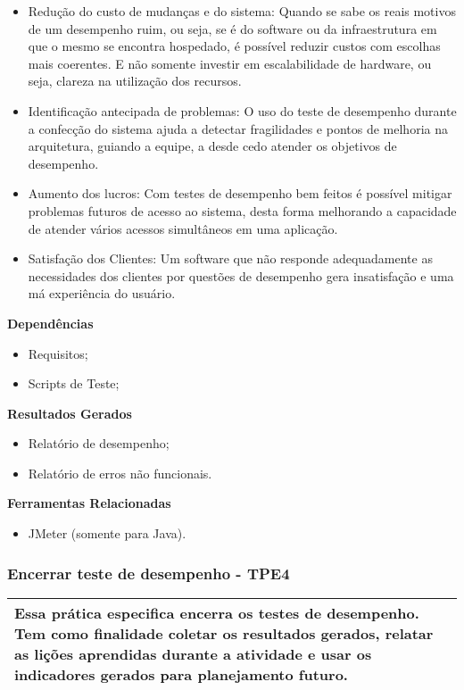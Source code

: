 \begin{itemize}
	\item Redução do custo de mudanças e do sistema: Quando se sabe os reais motivos de um desempenho ruim, ou seja, se é do software ou da infraestrutura em que o mesmo se encontra hospedado, é possível reduzir custos com escolhas mais coerentes. E não somente investir em escalabilidade de hardware, ou seja, clareza na utilização dos recursos.
	\item Identificação antecipada de problemas: O uso do teste de desempenho durante a confecção do sistema ajuda a detectar fragilidades e pontos de melhoria na arquitetura, guiando a equipe, a desde cedo atender os objetivos de desempenho.
	\item Aumento dos lucros: Com testes de desempenho bem feitos é possível mitigar problemas futuros de acesso ao sistema, desta forma melhorando a capacidade de atender vários acessos simultâneos em uma aplicação.
	\item Satisfação dos Clientes: Um software que não responde adequadamente as necessidades dos clientes por questões de desempenho gera insatisfação e uma má experiência do usuário.
\end{itemize}

\textbf{Dependências}
\begin{itemize}
    \item Requisitos;
    \item Scripts de Teste;
\end{itemize}

\textbf{Resultados Gerados}
\begin{itemize}
    \item Relatório de desempenho;
    \item Relatório de erros não funcionais.
\end{itemize}

\textbf{Ferramentas Relacionadas}
\begin{itemize}
    \item JMeter (somente para Java).
\end{itemize}

\subsubsection{Encerrar teste de desempenho - TPE4}
\label{sec:tpe1}

\begin{table}[H]
\centering
\begin{tabular}{|p{130mm}|}
\hline
Essa prática especifica encerra os testes de desempenho. Tem como finalidade coletar os resultados gerados, relatar as lições aprendidas durante a atividade e usar os indicadores gerados para planejamento futuro.\\ 
\hline
\end{tabular}
\end{table}

